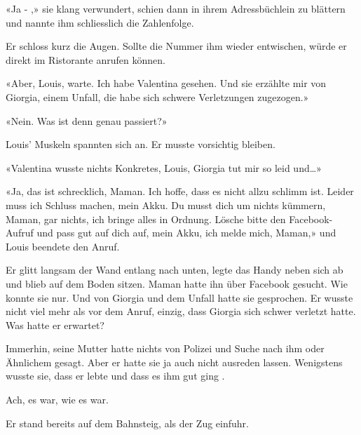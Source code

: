 «Ja - ,» sie klang verwundert, schien dann in ihrem Adressbüchlein zu blättern und nannte ihm schliesslich die Zahlenfolge. 

Er schloss kurz die Augen. Sollte die Nummer ihm wieder entwischen, würde er direkt im Ristorante anrufen können.

«Aber, Louis, warte. Ich habe Valentina gesehen. Und sie erzählte mir von
Giorgia, einem Unfall, die habe sich schwere Verletzungen zugezogen.»

«Nein. Was ist denn genau passiert?»

Louis’ Muskeln spannten sich an. Er musste vorsichtig bleiben.

«Valentina wusste nichts Konkretes, Louis, Giorgia tut mir so leid
und…»

«Ja, das ist schrecklich, Maman. Ich hoffe, dass es nicht allzu schlimm
ist. Leider muss ich Schluss machen, mein Akku. Du musst dich um nichts
kümmern, Maman, gar nichts, ich bringe alles in Ordnung. Lösche bitte den Facebook-Aufruf und  
pass gut auf dich auf, mein Akku, ich melde mich, Maman,» und Louis beendete den
Anruf.

Er glitt langsam der Wand entlang nach unten, legte das Handy neben
sich ab und blieb auf dem Boden sitzen. Maman hatte ihn über Facebook gesucht. Wie konnte sie nur. Und von
Giorgia und dem Unfall hatte sie gesprochen. Er wusste nicht viel
mehr als vor dem Anruf, einzig, dass Giorgia sich schwer verletzt hatte.
Was hatte er erwartet?

Immerhin, seine Mutter hatte nichts von Polizei und Suche nach ihm oder
Ähnlichem gesagt. Aber er hatte sie ja auch nicht ausreden lassen.
Wenigstens wusste sie, dass er lebte und dass es ihm gut ging .

Ach, es war, wie es war.

\sectionbreak

Er stand bereits auf dem Bahnsteig, als der Zug einfuhr.
